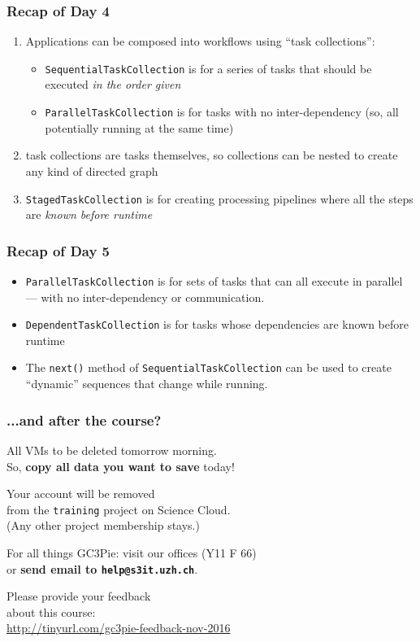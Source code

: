 \documentclass[english,serif,mathserif,xcolor=pdftex,dvipsnames,table]{beamer}
\begin{document}
\begin{frame}
  \frametitle{Recap of Day 4}

  \begin{enumerate}
  \item Applications can be composed into workflows using ``task collections'':
    \begin{itemize}
    \item \texttt{SequentialTaskCollection} is for a series of tasks that should
      be executed \emph{in the order given}
    \item \texttt{ParallelTaskCollection} is for tasks with no inter-dependency
      (so, all potentially running at the same time)
    \end{itemize}

  \item task collections are tasks themselves, so collections can be nested to
    create any kind of directed graph

  \item \texttt{StagedTaskCollection} is for creating processing pipelines where
    all the steps are \emph{known before runtime}
  \end{enumerate}
\end{frame}


\begin{frame}
  \frametitle{Recap of Day 5}

  \begin{itemize}
  \item \texttt{ParallelTaskCollection} is for sets of tasks that can all
    execute in parallel --- with no inter-dependency or communication.
  \item \texttt{DependentTaskCollection} is for tasks whose dependencies are
    known before runtime
  \item The \texttt{next()} method of \texttt{SequentialTaskCollection} can be
    used to create ``dynamic'' sequences that change while running.
  \end{itemize}

\end{frame}


\begin{frame}
  \frametitle{...and after the course?}
  \centering

  All VMs to be deleted tomorrow morning. \\
  So, \textbf{copy all data you want to save} today!

  \+ 
  Your account will be removed \\
  from the \texttt{training} project on Science Cloud. \\
  (Any other project membership stays.)

  \+
  For all things GC3Pie: visit our offices (Y11 F 66) \\
  or \textbf{send email to \texttt{help@s3it.uzh.ch}}.
\end{frame}


\begin{frame}{}
  \begin{center}
    \Large Please provide your feedback \\ about this course: \\
    \url{http://tinyurl.com/gc3pie-feedback-nov-2016}
  \end{center}
\end{frame}
\end{document}
